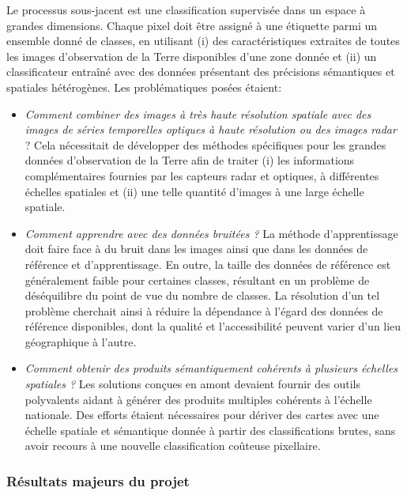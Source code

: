 Le processus sous-jacent est une classification supervisée dans un espace à grandes dimensions. Chaque pixel doit être assigné à une étiquette parmi un ensemble donné de classes, en utilisant (i) des caractéristiques extraites de toutes les images d'observation de la Terre disponibles d'une zone donnée et (ii) un classificateur entraîné avec des données présentant des précisions sémantiques et spatiales hétérogènes. Les problématiques posées étaient: 
\begin{itemize}
\item \textit{Comment combiner des images à très haute résolution spatiale avec des images de séries temporelles optiques à haute résolution ou des images radar} ? Cela nécessitait de développer des méthodes spécifiques pour les grandes données d'observation de la Terre afin de traiter (i) les informations complémentaires fournies par les capteurs radar et optiques, à différentes échelles spatiales et (ii) une telle quantité d'images à une large échelle spatiale.
\item \textit{Comment apprendre avec des données bruitées ?} La méthode d'apprentissage doit faire face à
du bruit dans les images ainsi que dans les données de référence et d’apprentissage. 
En outre, la taille des données de référence est généralement faible pour certaines classes, résultant en un problème de déséquilibre du point de vue du nombre de classes. La résolution d'un tel problème cherchait ainsi à réduire la dépendance à l'égard des données de référence disponibles, dont la qualité et l'accessibilité peuvent varier d'un lieu géographique à l'autre.
\item \textit{Comment obtenir des produits sémantiquement cohérents à plusieurs échelles spatiales ?} Les solutions conçues en amont devaient fournir des outils polyvalents aidant à générer des produits multiples cohérents à l'échelle nationale. Des efforts étaient nécessaires pour dériver des cartes avec une échelle spatiale et sémantique donnée à partir des classifications brutes, sans avoir recours à une nouvelle classification coûteuse pixellaire.

\end{itemize}

\subsubsection*{Résultats majeurs du projet}

